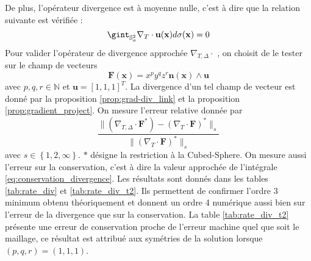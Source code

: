 De plus, l'opérateur divergence est à moyenne nulle, c'est à dire que la relation suivante est vérifiée :
\begin{equation}
\gint_{\mathbb{S}_a^2} \nabla_T \cdot \mathbf{u} ( \mathbf{x} ) d \sigma ( \mathbf{x} ) = 0
\label{eq:conservation_divergence}
\end{equation}
Pour valider l'opérateur de divergence approchée $\nabla_{T, \Delta} \cdot$ , on choisit de le tester sur le champ de vecteurs 
\begin{equation}
\mathbf{F}(\mathbf{x}) = x^p y^q z^r \mathbf{n}(\mathbf{x}) \wedge \mathbf{u}
\label{eq:test_divergence}
\end{equation}
avec $p,q,r \in \mathbb{N}$ et $\mathbf{u} = [1, 1, 1]^T$. La divergence d'un tel champ de vecteur est donné par la proposition \ref{prop:grad-div_link} et la proposition \ref{prop:gradient_project}. 
On mesure l'erreur relative donnée par 
\begin{equation}
\dfrac{\| \left(\nabla_{T,\Delta} \cdot \mathbf{F}^* \right) - \left( \nabla_{T} \cdot \mathbf{F}\right)^* \|_s}{\| \left( \nabla_{T} \cdot \mathbf{F} \right)^* \|_s}
\end{equation}
avec $s \in \left\lbrace 1, 2, \infty \right\rbrace$. $*$ désigne la restriction à la Cubed-Sphere.
On mesure aussi l'erreur sur la conservation, c'est à dire la valeur approchée de l'intégrale \ref{eq:conservation_divergence}. Les résultats sont donnés dans les tables \ref{tab:rate_div} et \ref{tab:rate_div_t2}. Ils permettent de confirmer l'ordre 3 minimum obtenu théoriquement et donnent un ordre 4 numérique aussi bien sur l'erreur de la divergence que sur la conservation. La table \ref{tab:rate_div_t2} présente une erreur de conservation proche de l'erreur machine quel que soit le maillage, ce résultat est attribué aux symétries de la solution lorsque $(p,q,r)=(1,1,1)$.
